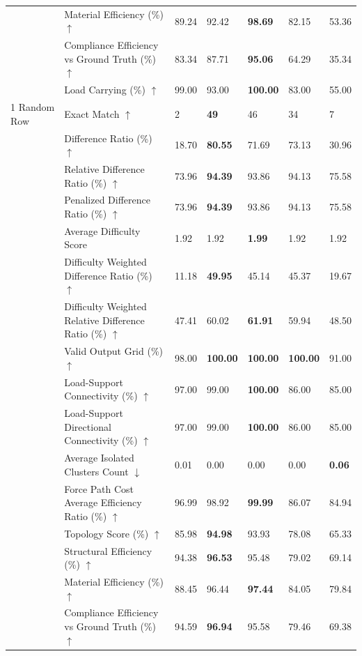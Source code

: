 \begin{table}[!h]
{\begin{tabular}{lllllll}
 & Material Efficiency (\%) $\uparrow$ & 89.24 & 92.42 & \textbf{98.69} & 82.15 & 53.36 \\
 & Compliance Efficiency vs Ground Truth (\%) $\uparrow$ & 83.34 & 87.71 & \textbf{95.06} & 64.29 & 35.34 \\
 & Load Carrying (\%) $\uparrow$ & 99.00 & 93.00 & \textbf{100.00} & 83.00 & 55.00 \\
1 Random Row & Exact Match $\uparrow$ & 2 & \textbf{49} & 46 & 34 & 7 \\
 & Difference Ratio (\%) $\uparrow$ & 18.70 & \textbf{80.55} & 71.69 & 73.13 & 30.96 \\
 & Relative Difference Ratio (\%) $\uparrow$ & 73.96 & \textbf{94.39} & 93.86 & 94.13 & 75.58 \\
 & Penalized Difference Ratio (\%) $\uparrow$ & 73.96 & \textbf{94.39} & 93.86 & 94.13 & 75.58 \\
 & Average Difficulty Score & 1.92 & 1.92 & \textbf{1.99} & 1.92 & 1.92 \\
 & Difficulty Weighted Difference Ratio (\%) $\uparrow$ & 11.18 & \textbf{49.95} & 45.14 & 45.37 & 19.67 \\
 & Difficulty Weighted Relative Difference Ratio (\%) $\uparrow$ & 47.41 & 60.02 & \textbf{61.91} & 59.94 & 48.50 \\
 & Valid Output Grid (\%) $\uparrow$ & 98.00 & \textbf{100.00} & \textbf{100.00} & \textbf{100.00} & 91.00 \\
 & Load-Support Connectivity (\%) $\uparrow$ & 97.00 & 99.00 & \textbf{100.00} & 86.00 & 85.00 \\
 & Load-Support Directional Connectivity (\%) $\uparrow$ & 97.00 & 99.00 & \textbf{100.00} & 86.00 & 85.00 \\
 & Average Isolated Clusters Count $\downarrow$ & 0.01 & 0.00 & 0.00 & 0.00 & \textbf{0.06} \\
 & Force Path Cost Average Efficiency Ratio (\%) $\uparrow$ & 96.99 & 98.92 & \textbf{99.99} & 86.07 & 84.94 \\
 & Topology Score (\%) $\uparrow$ & 85.98 & \textbf{94.98} & 93.93 & 78.08 & 65.33 \\
 & Structural Efficiency (\%) $\uparrow$ & 94.38 & \textbf{96.53} & 95.48 & 79.02 & 69.14 \\
 & Material Efficiency (\%) $\uparrow$ & 88.45 & 96.44 & \textbf{97.44} & 84.05 & 79.84 \\
 & Compliance Efficiency vs Ground Truth (\%) $\uparrow$ & 94.59 & \textbf{96.94} & 95.58 & 79.46 & 69.38 \\

\end{tabular}}
\end{table}
